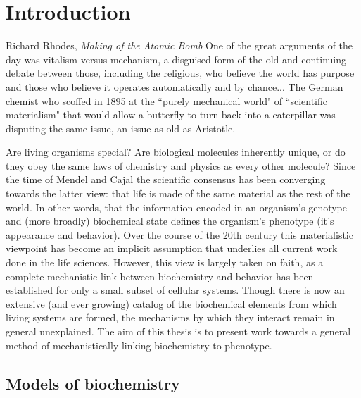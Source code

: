 \chapter{Introduction}

\begin{chapquote}{Richard Rhodes, \textit{Making of the Atomic Bomb}\supercite{Rhodes:1986ux}}
One of the great arguments of the day was vitalism versus mechanism, a disguised form of the old and continuing debate between those, including the religious, who believe the world has purpose and those who believe it operates automatically and by chance... The German chemist who scoffed in 1895 at the ``purely mechanical world" of ``scientific materialism" that would allow a butterfly to turn back into a caterpillar was disputing the same issue, an issue as old as Aristotle.
\end{chapquote}

Are living organisms special? Are biological molecules inherently unique, or do they obey the same laws of chemistry and physics as every other molecule? Since the time of Mendel\supercite{Johannsen:2014iv} and Cajal\supercite{hellman2001great} the scientific consensus has been converging towards the latter view: that life is made of the same material as the rest of the world. In other words, that the information encoded in an organism’s genotype and (more broadly) biochemical state defines the organism’s phenotype (\ie it’s appearance and behavior). Over the course of the 20th century this materialistic viewpoint has become an implicit assumption that underlies all current work done in the life sciences. However, this view is largely taken on faith, as a complete mechanistic link between biochemistry and behavior has been established for only a small subset of cellular systems. Though there is now an extensive (and ever growing) catalog of the biochemical elements from which living systems are formed, the mechanisms by which they interact remain in general unexplained. The aim of this thesis is to present work towards a general method of mechanistically linking biochemistry to phenotype.

\section{Models of biochemistry}

